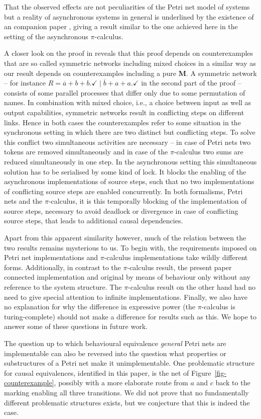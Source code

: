 \documentclass[submission,copyright,creativecommons]{eptcs}
\theoremstyle{definition}
\def\figurename{Figure}
\newcommand{\reffig}[1]{\figurename~\ref{fig-#1}}
\begin{document}
That the observed effects are not peculiarities of the Petri net model of systems but
a reality of asynchronous systems in general is underlined by the existence of an
companion paper \cite{peters11asynchronouspi}, giving a result similar to the one
achieved here in the setting of the asynchronous $\pi$-calculus.

A closer look on the proof in \cite{peters11asynchronouspi} reveals that this
proof depends on counterexamples that are so called symmetric networks
including mixed choices in a similar way as our result depends on counterexamples including a
pure \textbf{M}. A symmetric network -- for instance $
R = \overline{a} + b + b.\checkmark \mid \overline{b} + a + a.\checkmark $ in
the second part of the proof -- consists of some
parallel processes that differ only due to some permutation of names. In
combination with mixed choice, i.e., a choice between input as well as output
capabilities, symmetric networks result in conflicting steps on different
links. Hence in both cases the counterexamples refer to some situation in the
synchronous setting in which there are two distinct but conflicting steps. To
solve this conflict two simultaneous activities are necessary -- in case of Petri
nets two tokens are removed simultaneously and in case of the $ \pi $-calculus
two sums are reduced simultaneously in one step. In the asynchronous setting
this simultaneous solution has to be serialised by some kind of lock. It
blocks the enabling of the asynchronous implementations of source steps, such
that no two implementations of conflicting source steps are enabled
concurrently. In both formalisms, Petri nets and the $ \pi $-calculus, it is
this temporally blocking of the implementation of source steps, necessary to
avoid deadlock or divergence in case of conflicting source steps, that leads to
additional causal dependencies.

Apart from this apparent similarity however, much of the relation between the two
results remains mysterious to us. To begin with, the requirements imposed on
Petri net implementations and $\pi$-calculus implementations take wildly different
forms. Additionally, in contrast to the $\pi$-calculus result, the present paper
connected implementation and original by means of behaviour only without any
reference to the system structure. The $\pi$-calculus result on the other hand
had no need to give special
attention to infinite implementations. Finally, we also have no explanation for why
the difference in expressive power (the $\pi$-calculus is turing-complete) should
not make a difference for results such as this. We hope to answer some of these
questions in future work.

The question up to which behavioural equivalence \emph{general} Petri nets are
implementable can also be reversed into the question what properties or substructures of a Petri net
make it unimplementable. One problematic structure for causal equivalences,
identified in this paper, is the net of \reffig{counterexample}, possibly with a
more elaborate route from $a$ and $c$ back to the marking enabling all three transitions.
We did not prove that no fundamentally different problematic structures exists,
but we conjecture that this is indeed the case.



\end{document}
